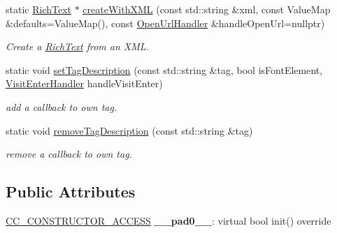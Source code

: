 \begin{DoxyCompactItemize}
static \hyperlink{classui_1_1RichText}{Rich\+Text} $\ast$ \hyperlink{classui_1_1RichText_a90c6d73c16d60b0f32308edb67415116}{create\+With\+X\+ML} (const std\+::string \&xml, const Value\+Map \&defaults=Value\+Map(), const \hyperlink{classui_1_1RichText_ad3631ae61d204f1d9576f5923bbd762e}{Open\+Url\+Handler} \&handle\+Open\+Url=nullptr)
\begin{DoxyCompactList}\small\item\em Create a \hyperlink{classui_1_1RichText}{Rich\+Text} from an X\+ML. \end{DoxyCompactList}\item 
static void \hyperlink{classui_1_1RichText_a67bacb0c6c0706f3dd47cd9b1b2b3034}{set\+Tag\+Description} (const std\+::string \&tag, bool is\+Font\+Element, \hyperlink{classui_1_1RichText_a195114ba2bddc97248b8a0c400d489f7}{Visit\+Enter\+Handler} handle\+Visit\+Enter)
\begin{DoxyCompactList}\small\item\em add a callback to own tag. \end{DoxyCompactList}\item 
static void \hyperlink{classui_1_1RichText_a3f03f9553cb5f1036b7a6645c5eb842a}{remove\+Tag\+Description} (const std\+::string \&tag)
\begin{DoxyCompactList}\small\item\em remove a callback to own tag. \end{DoxyCompactList}\end{DoxyCompactItemize}
\subsection*{Public Attributes}
\begin{DoxyCompactItemize}
\item 
\mbox{\label{classui_1_1RichText_ac564fb6d8edb55c846930b57994d32c0}} 
\hyperlink{_2cocos2d_2cocos_2base_2ccConfig_8h_a25ef1314f97c35a2ed3d029b0ead6da0}{C\+C\+\_\+\+C\+O\+N\+S\+T\+R\+U\+C\+T\+O\+R\+\_\+\+A\+C\+C\+E\+SS} {\bfseries \+\_\+\+\_\+pad0\+\_\+\+\_\+}\+: virtual bool init() override
\end{DoxyCompactItemize}
